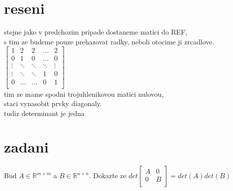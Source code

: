 \documentclass[a4paper]{article}
\begin{document}
\section*{reseni}
stejne jako v predchozim pripade dostaneme matici do REF, \\
s tim ze budeme pouze prehazovat radky, neboli otocime ji zrcadlove.\\
$
\left[ \begin{matrix} 
	1 & 2 & 2 & \dots & 2 \\
	0 & 1 & 0 & \dots & 0 \\
	\vdots & \ddots & \ddots & \ddots & \vdots \\
	\vdots & \ddots & \ddots & 1 & 0 \\
	0 & \dots & \dots & 0 & 1 \\
\end{matrix} \right]
$\\
tim ze mame spodni trojuhlenikovou matici nulovou,\\
staci vynasobit prvky diagonaly.\\
tudiz determinant je jedna




\section*{zadani}
Bud $A\in\mathbb{R}^{m\times m}$ a $B\in\mathbb{R}^{n\times n}$.
Dokazte ze $
det
\left[ \begin{matrix} 
	A & 0 \\
	0 & B \\
\end{matrix} \right]
= det(A)det(B)
$ 
\end{document}
